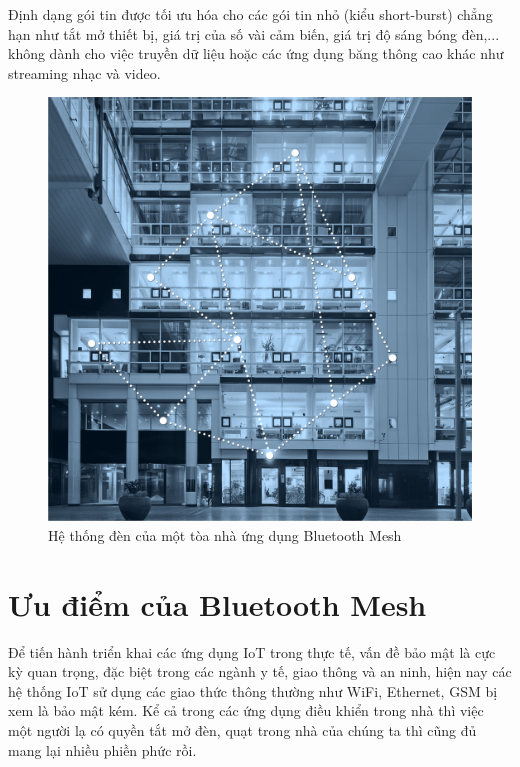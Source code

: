         Định dạng gói tin được tối ưu hóa cho các gói tin nhỏ (kiểu short-burst) chẳng hạn như tắt mở thiết bị, giá trị của số vài cảm biến, giá trị độ sáng bóng đèn,... không dành cho việc truyền dữ liệu hoặc các ứng dụng băng thông cao khác như streaming nhạc và video.
        \begin{figure}[h!]
        	\begin{center}
        		\includegraphics[scale=0.2]{images/Office_4_square_LE-mesh.jpg}
        		\caption{Hệ thống đèn của một tòa nhà ứng dụng Bluetooth Mesh}
        	\end{center}
        \end{figure}
        
    \section{Ưu điểm của Bluetooth Mesh}
    Để tiến hành triển khai các ứng dụng IoT trong thực tế, vấn đề bảo mật là cực kỳ quan trọng, đặc biệt trong các ngành y tế, giao thông và an ninh, hiện nay các hệ thống IoT sử dụng các giao thức thông thường như WiFi, Ethernet, GSM bị xem là bảo mật kém. Kể cả trong các ứng dụng điều khiển trong nhà thì việc một người lạ có quyền tắt mở đèn, quạt trong nhà của chúng ta thì cũng đủ mang lại nhiều phiền phức rồi. \\
    
